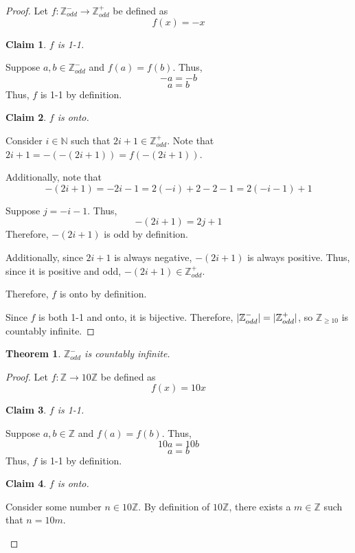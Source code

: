 \documentclass{article}
\DeclarePairedDelimiter\abs{\lvert}{\rvert}%
\newtheorem{theorem}{Theorem}
\newtheorem{claim}{Claim}[theorem]
\begin{document}
\begin{outline}[enumerate]
    \begin{proof}
        Let $f: \mathbb{Z}^-_{odd} \rightarrow \mathbb{Z}^+_{odd}$ be defined as 
        $$f(x) = -x$$
        \begin{claim}
            $f$ is 1-1.
        \end{claim}
        \begin{adjustwidth}{.5cm}{.5cm}
            Suppose $a, b \in \mathbb{Z}^-_{odd}$ and $f(a) = f(b)$. Thus,
            $$-a = -b$$
            $$a = b$$
            Thus, $f$ is 1-1 by definition.
        \end{adjustwidth}
        \begin{claim}
            $f$ is onto.
        \end{claim}
        \begin{adjustwidth}{.5cm}{.5cm}
            Consider $i \in \mathbb{N}$ such that $2i + 1 \in \mathbb{Z}^+_{odd}$. Note that $2i + 1 = -(-(2i + 1)) = f(-(2i + 1))$. 
            
            Additionally, note that 
            $$-(2i + 1) = -2i - 1 = 2(-i) + 2 - 2 - 1 = 2(-i - 1) +1$$

            Suppose $j = -i - 1$. Thus,
            $$-(2i + 1) = 2j + 1$$
            Therefore, $-(2i + 1)$ is odd by definition.

            Additionally, since $2i + 1$ is always negative, $-(2i + 1)$ is always positive. Thus, since it is positive and odd, $-(2i + 1) \in \mathbb{Z}^+_{odd}$.

            Therefore, $f$ is onto by definition.
        \end{adjustwidth}

        Since $f$ is both 1-1 and onto, it is bijective. Therefore, $\abs{\mathbb{Z}^-_{odd}} = \abs{\mathbb{Z}^+_{odd}}$, so $\mathbb{Z}_{\geq 10}$ is countably infinite.
    \end{proof}

    \1 \begin{theorem}
        $\mathbb{Z}^-_{odd}$ is countably infinite.
    \end{theorem}
    
    \begin{proof}
        Let $f: \mathbb{Z} \rightarrow 10\mathbb{Z}$ be defined as 
        $$f(x) = 10x$$
        \begin{claim}
            $f$ is 1-1.
        \end{claim}
        \begin{adjustwidth}{.5cm}{.5cm}
            Suppose $a, b \in \mathbb{Z}$ and $f(a) = f(b)$. Thus,
            $$10a = 10b$$
            $$a = b$$
            Thus, $f$ is 1-1 by definition.
        \end{adjustwidth}
        \begin{claim}
            $f$ is onto.
        \end{claim}
        \begin{adjustwidth}{.5cm}{.5cm}
            Consider some number $n \in 10\mathbb{Z}$. By definition of $10\mathbb{Z}$, there exists a $m \in \mathbb{Z}$ such that $n = 10m$. 


\end{adjustwidth}
\end{proof}
\end{outline}
\end{document}
